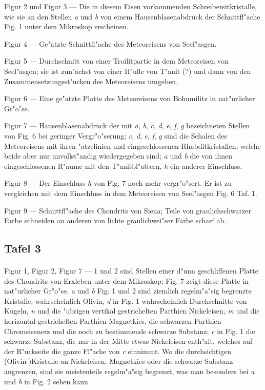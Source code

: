 \documentclass[a4paper, 11pt, oneside]{article}
\begin{document}
Figur 2 und Figur 3 --- Die in diesem Eisen vorkommenden Schreibersitkristalle, wie sie an den Stellen \emph{a} und \emph{b} von einem Hausenblasenabdruck der Schnittfl"ache Fig. 1 unter dem Mikroskop erscheinen.

Figur 4 --- Ge"atzte Schnittfl"ache des Meteoreisens von Seel"asgen.

Figur 5 --- Durchschnitt von einer Troilitpartie in dem Meteoreisen von Seel"asgen; sie ist zun"achst von einer H"ulle von T"anit (?) und dann von den Zusammensetzungsst"ucken des Meteoreisens umgeben.

Figur 6 --- Eine ge"atzte Platte des Meteoreisens von Bohumilitz in nat"urlicher Gr"o"se.

Figur 7 --- Hausenblasenabdruck der mit \emph{a}, \emph{b}, \emph{c}, \emph{d}, \emph{e}, \emph{f}, \emph{g} bezeichneten Stellen von Fig. 6 bei geringer Vergr"o"serung; \emph{c}, \emph{d}, \emph{e}, \emph{f}, \emph{g} sind die Schalen des Meteoreisens mit ihren "atzelinien und eingeschlossenen Rhabditkristallen, welche beide aber nur unvollst"andig wiedergegeben sind; \emph{a} und \emph{b} die von ihnen eingeschlossenen R"aume mit den T"anitbl"attern, \emph{h} ein anderer Einschluss.

Figur 8 --- Der Einschluss \emph{h} von Fig. 7 noch mehr vergr"o"sert. Er ist zu vergleichen mit dem Einschluss in dem Meteoreisen von Seel"asgen Fig. 6 Taf. 1.

Figur 9 --- Schnittfl"ache des Chondrits von Siena; Teile von graulichschwarzer Farbe schneiden an anderen von lichte graulichwei"ser Farbe scharf ab.

\subsection{Tafel 3}
\paragraph{}
Figur 1, Figur 2, Figur 7 --- 1 und 2 sind Stellen einer d"unn geschliffenen Platte des Chondrits von Erxleben unter dem Mikroskop; Fig. 7 zeigt diese Platte in nat"urlicher Gr"o"se. \emph{a} und \emph{b} Fig. 1 und 2 sind ziemlich regelm"a"sig begrenzte Kristalle, wahrscheinlich Olivin, \emph{d} in Fig. 1 wahrscheinlich Durchschnitte von Kugeln, \emph{n} und die "ubrigen vertikal gestrichelten Parthien Nickeleisen, \emph{m} und die horizontal gestrichelten Parthien Magnetkies, die schwarzen Parthien Chromeisenerz und die noch zu bestimmende schwarze Substanz; \emph{c} in Fig. 1 die schwarze Substanz, die nur in der Mitte etwas Nickeleisen enth"alt, welches auf der R"uckseite die ganze Fl"ache von \emph{c} einnimmt. Wo die durchsichtigen (Olivin-)Kristalle an Nickeleisen, Magnetkies oder die schwarze Substanz angrenzen, sind sie meistenteils regelm"a"sig begrenzt, was man besonders bei \emph{a} und \emph{b} in Fig. 2 sehen kann.
\end{document}
